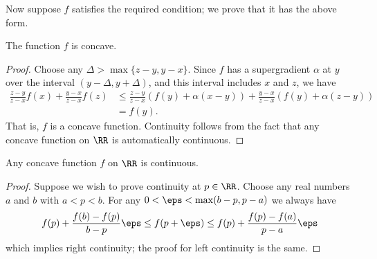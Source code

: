 \documentclass[11pt]{scrartcl}
\begin{document}
Now suppose $f$ satisfies the required condition; we prove that it has
the above form.

\begin{claim*}
  The function $f$ is concave.
\end{claim*}
\begin{proof}
  Choose any $\Delta > \max\{z-y,y-x\}$.
  Since $f$ has a supergradient $\alpha$ at $y$ over the interval
  $(y-\Delta,y+\Delta)$, and this interval includes $x$ and $z$, we have
  \begin{align*}
  \frac{z-y}{z-x}f(x) + \frac{y-x}{z-x}f(z) &\leq
  \frac{z-y}{z-x}(f(y) + \alpha(x-y)) + \frac{y-x}{z-x}(f(y) +
  \alpha(z-y)) \\
  &= f(y).
  \end{align*}
  That is, $f$ is a concave function.
  Continuity follows from the fact that any concave
  function on $\RR$ is automatically continuous.
\end{proof}

\begin{lemma*}
  Any concave function $f$ on $\RR$ is continuous.
\end{lemma*}
\begin{proof}
  Suppose we wish to prove continuity at $p \in \RR$.
  Choose any real numbers $a$ and $b$ with $a < p < b$.
  For any $0 < \eps < \max(b-p,p-a)$ we always have
  \[ f(p) + \frac{f(b)-f(p)}{b-p} \eps \le f(p+\eps) \le f(p) + \frac{f(p)-f(a)}{p-a} \eps \]
  which implies right continuity; the proof for left continuity is the same.
\end{proof}
\end{document}
